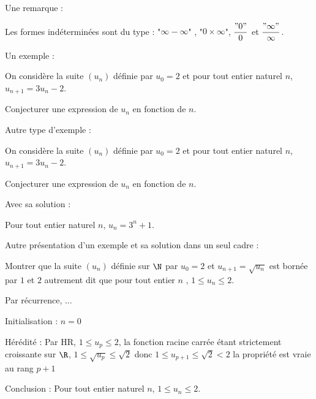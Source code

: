 \documentclass[12pt, french]{book}
\begin{document}
Une remarque :

\begin{Rmq}
Les formes indéterminées sont du type : "$\infty-\infty$" , "$0 \times \infty$", $\dfrac{"0"}{0}$ et $\dfrac{"\infty"}{\infty}$.
\end{Rmq}

Un exemple :

\begin{Exemple}
On considère la suite $(u_n)$ définie par $u_0=2$ et pour tout entier naturel $n$, $u_{n+1}=3u_n - 2$.

Conjecturer une expression de $u_n$ en fonction de $n$.
\end{Exemple}


Autre type d'exemple :

\begin{ExempleBis}
On considère la suite $(u_n)$ définie par $u_0=2$ et pour tout entier naturel $n$, $u_{n+1}=3u_n - 2$.

Conjecturer une expression de $u_n$ en fonction de $n$.
\end{ExempleBis}

Avec sa solution :


\begin{Solution}
Pour tout entier naturel $n$, $u_n = 3^n+1$.
\end{Solution}

Autre présentation d'un exemple et sa solution dans un seul cadre :

\begin{ExempleTer}
Montrer que la suite $(u_n)$ définie sur $\N$ par $u_0 = 2$ et $u_{n+1} = \sqrt{u_n}$ est bornée par $1$ et $2$ autrement dit que pour tout entier $n$ , $1 \leq u_n \leq 2$.

\tcblower

Par récurrence, ...

Initialisation : $n=0$

Hérédité : Par HR, $1 \leq u_p  \leq 2$, la fonction racine carrée étant strictement croissante sur $\R$,
$1 \leq \sqrt{u_p} \leq \sqrt{2}$ donc $1 \leq u_{p+1} \leq \sqrt{2} < 2$ la propriété est vraie au rang $p+1$

Conclusion : Pour tout entier naturel $n$, $1 \leq u_n \leq 2$.
\end{ExempleTer}
\end{document}
